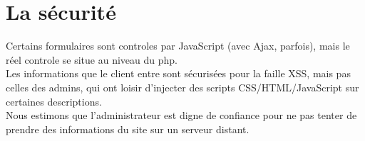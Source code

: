 		\section{La sécurité}
			Certains formulaires sont controles par JavaScript (avec Ajax, parfois), mais le réel controle se situe au niveau du php.\\
			Les informations que le client entre sont sécurisées pour la faille XSS, mais pas celles des admins, qui ont loisir d'injecter des scripts CSS/HTML/JavaScript sur certaines descriptions.\\
			Nous estimons que l'administrateur est digne de confiance pour ne pas tenter de prendre des informations du site sur un serveur distant.